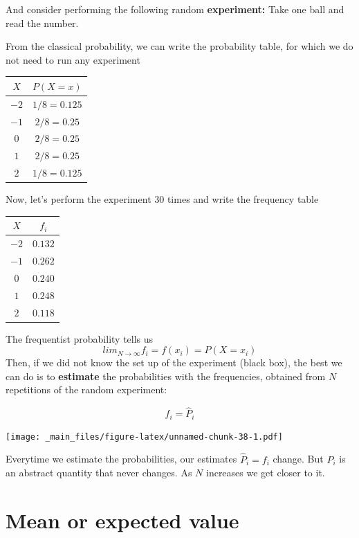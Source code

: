 \documentclass[
]{book}
\begin{document}
And consider performing the following random \textbf{experiment:} Take one ball and read the number.

From the classical probability, we can write the probability table, for which we do not need to run any experiment

\begin{longtable}[]{@{}cc@{}}
\toprule
\(X\) & \(P(X=x)\) \\
\midrule
\endhead
\(-2\) & \(1/8=0.125\) \\
\(-1\) & \(2/8=0.25\) \\
\(0\) & \(2/8=0.25\) \\
\(1\) & \(2/8=0.25\) \\
\(2\) & \(1/8=0.125\) \\
\bottomrule
\end{longtable}

Now, let's perform the experiment \(30\) times and write the frequency table

\begin{longtable}[]{@{}cc@{}}
\toprule
\(X\) & \(f_i\) \\
\midrule
\endhead
\(-2\) & \(0.132\) \\
\(-1\) & \(0.262\) \\
\(0\) & \(0.240\) \\
\(1\) & \(0.248\) \\
\(2\) & \(0.118\) \\
\bottomrule
\end{longtable}

The frequentist probability tells us
\[lim_{N \rightarrow \infty} f_i = f(x_i)=P(X=x_i)\]
Then, if we did not know the set up of the experiment (black box), the best we can do is to \textbf{estimate} the probabilities with the frequencies, obtained from \(N\) repetitions of the random experiment:

\[f_i = \hat{P}_i\]

\texttt{[image: \_main\_files/figure-latex/unnamed-chunk-38-1.pdf]}

Everytime we estimate the probabilities, our estimates \(\hat{P}_i=f_i\) change. But \(P_i\) is an abstract quantity that never changes. As \(N\) increases we get closer to it.

\hypertarget{mean-or-expected-value}{%
\section{Mean or expected value}\label{mean-or-expected-value}}
\end{document}
